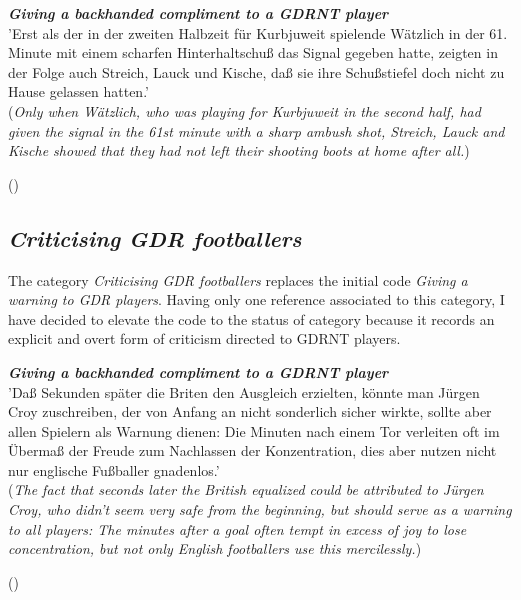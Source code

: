 \begin{displayquote}
\begin{small}
\textbf{\textit{Giving a backhanded compliment to a GDRNT player}}\\
'Erst als der in der zweiten Halbzeit für Kurbjuweit spielende Wätzlich in der 61. Minute mit einem scharfen Hinterhaltschuß das Signal gegeben hatte, zeigten in der Folge auch Streich, Lauck und Kische, daß sie ihre Schußstiefel doch nicht zu Hause gelassen hatten.'\\
(\textit{Only when Wätzlich, who was playing for Kurbjuweit in the second half, had given the signal in the 61st minute with a sharp ambush shot, Streich, Lauck and Kische showed that they had not left their shooting boots at home after all.})\
\begin{flushright}\footnotesize (\cite{nd19740524})\end{flushright}
\end{small}
\end{displayquote}

\subsection*{\textit{Criticising GDR footballers}}

The category \textit{Criticising GDR footballers} replaces the initial code \textit{Giving a warning to GDR players}. Having only one reference associated to this category, I have decided to elevate the code to the status of category because it records an explicit and overt form of criticism directed to GDRNT players.

\begin{displayquote}
\begin{small}
\textbf{\textit{Giving a backhanded compliment to a GDRNT player}}\\
'Daß Sekunden später die Briten den Ausgleich erzielten, könnte man Jürgen Croy zuschreiben, der von Anfang an nicht sonderlich sicher wirkte, sollte aber allen Spielern als Warnung dienen: Die Minuten nach einem Tor verleiten oft im Übermaß der Freude zum Nachlassen der Konzentration, dies aber nutzen nicht nur englische Fußballer gnadenlos.'\\
(\textit{The fact that seconds later the British equalized could be attributed to Jürgen Croy, who didn't seem very safe from the beginning, but should serve as a warning to all players: The minutes after a goal often tempt in excess of joy to lose concentration, but not only English footballers use this mercilessly.})\
\begin{flushright}\footnotesize (\cite{nd19740530})\end{flushright}
\end{small}
\end{displayquote}

